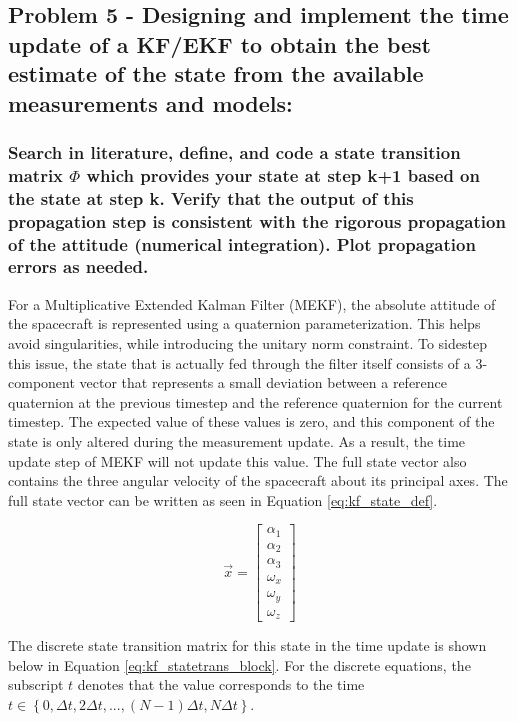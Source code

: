\subsection{Problem 5 - Designing and implement the time update of a KF/EKF to obtain the best estimate of the state from the available measurements and models:}

\subsubsection{Search in literature, define, and code a state transition matrix $\Phi$ which provides your state at step k+1 based on the state at step k. Verify that the output of this propagation step is consistent with the rigorous propagation of the attitude (numerical integration). Plot propagation errors as needed.}

For a Multiplicative Extended Kalman Filter (MEKF), the absolute attitude of the spacecraft is represented using a quaternion parameterization. This helps avoid singularities, while introducing the unitary norm constraint. To sidestep this issue, the state that is actually fed through the filter itself consists of a 3-component vector that represents a small deviation between a reference quaternion at the previous timestep and the reference quaternion for the current timestep. The expected value of these values is zero, and this component of the state is only altered during the measurement update. As a result, the time update step of MEKF will not update this value. The full state vector also contains the three angular velocity of the spacecraft about its principal axes. The full state vector can be written as seen in Equation \ref{eq:kf_state_def}.

\begin{equation} \label{eq:kf_state_def}
    \vec{x} = \begin{bmatrix}
        \alpha_1 \\ \alpha_2 \\ \alpha_3 \\ \omega_x \\ \omega_y \\ \omega_z
    \end{bmatrix}
\end{equation}

The discrete state transition matrix for this state in the time update is shown below in Equation \ref{eq:kf_statetrans_block}. For the discrete equations, the subscript $t$ denotes that the value corresponds to the time $t \in \left\{ 0, \Delta t, 2 \Delta t, ..., (N-1) \Delta t, N \Delta t \right\}$.

